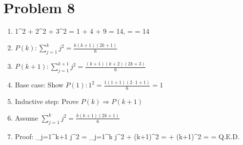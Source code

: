 \section*{Problem 8}
\begin{enumerate}[label=(\alph*)]
\item 
1^2 + 2^2 + 3^2 = 1 + 4 + 9 = 14, \quad {} =  = 14
\item \( P(k): \sum_{j=1}^k j^2 = \frac{k(k+1)(2k+1)}{6} \)
\item \( P(k+1): \sum_{j=1}^{k+1} j^2 = \frac{(k+1)(k+2)(2k+3)}{6} \)
\item Base case: Show \( P(1): 1^2 = \frac{1(1+1)(2\cdot1+1)}{6} = 1 \)
\item Inductive step: Prove \( P(k) \Rightarrow P(k+1) \)
\item Assume \( \sum_{j=1}^k j^2 = \frac{k(k+1)(2k+1)}{6} \)
\item Proof:
\sum_{j=1}^{k+1} j^2 = \sum_{j=1}^k j^2 + (k+1)^2 =  + (k+1)^2
=  = 
Q.E.D.
\end{enumerate}
